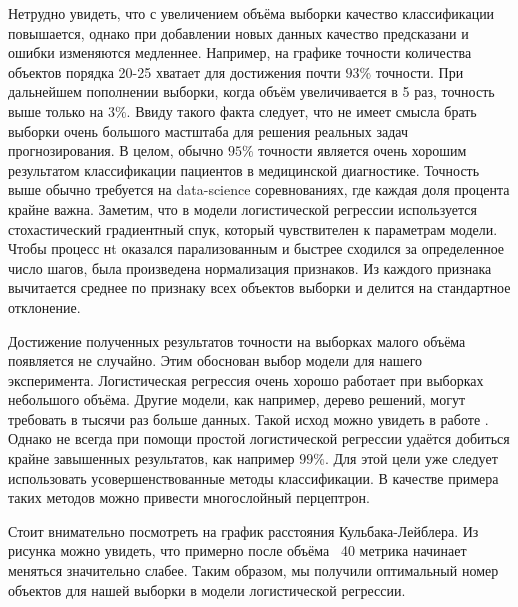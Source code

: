 \documentclass[12pt,twoside]{article}
\begin{document}
Нетрудно увидеть, что с увеличением объёма выборки качество классификации повышается, однако при добавлении новых данных качество предсказани и ошибки изменяются медленнее. Например, на графике точности количества объектов порядка 20-25 хватает для достижения почти $93\%$ точности. При дальнейшем пополнении выборки, когда объём увеличивается в 5 раз, точность выше только на $3\%$. Ввиду такого факта следует, что не имеет смысла брать выборки очень большого мастштаба для решения реальных задач прогнозирования. В целом, обычно $95\%$ точности является очень хорошим результатом классификации пациентов в медицинской диагностике. Точность выше обычно требуется на data-science соревнованиях, где каждая доля процента крайне важна. Заметим, что в модели логистической регрессии используется стохастический градиентный спук, который чувствителен к параметрам модели. Чтобы процесс нt оказался парализованным и быстрее сходился за определенное число шагов, была произведена нормализация признаков. Из каждого признака вычитается среднее по признаку всех объектов выборки и делится на стандартное отклонение.

Достижение полученных результатов точности на выборках малого объёма появляется не случайно. Этим обоснован выбор модели для нашего эксперимента. Логистическая регрессия очень хорошо работает при выборках небольшого объёма. Другие модели, как например, дерево решений, могут требовать в тысячи раз больше данных. Такой исход можно увидеть в работе \cite{smpltr}. Однако не всегда при помощи простой логистической регрессии удаётся добиться крайне завышенных результатов, как например $99\%$. Для этой цели уже следует использовать усовершенствованные методы классификации. В качестве примера таких методов можно привести многослойный перцептрон.
  

\begin{figure}[h]
	\centering
	\label{fg:kl}
\end{figure}

Стоит внимательно посмотреть на график расстояния Кульбака-Лейблера. Из рисунка можно увидеть, что примерно после объёма ~40 метрика начинает меняться значительно слабее. Таким образом, мы получили оптимальный номер объектов для нашей выборки в модели логистической регрессии.
 
\end{document}
